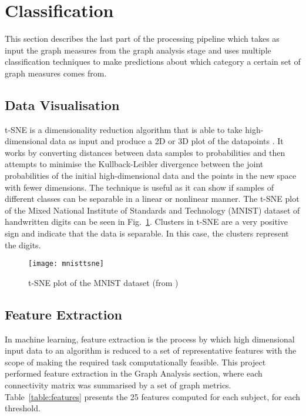 
	\section{Classification}
	This section describes the last part of the processing pipeline which takes as input the graph measures from the graph analysis stage and uses multiple classification techniques to make predictions about which category a certain set of graph measures comes from.

	\subsection{Data Visualisation}
	\ac{t-SNE} is a dimensionality reduction algorithm that is able to take high-dimensional data as input and produce a 2D or 3D plot of the datapoints \autocite{Maaten2008}. It works by converting distances between data samples to probabilities and then attempts to minimise the Kullback-Leibler divergence between the joint probabilities of the initial high-dimensional data and the points in the new space with fewer dimensions. The technique is useful as it can show if samples of different classes can be separable in a linear or nonlinear manner. The \ac{t-SNE} plot of the Mixed National Institute of Standards and Technology (MNIST) dataset of handwritten digits can be seen in Fig.~\ref{fig:mnisttsne}. Clusters in \ac{t-SNE} are a very positive sign and indicate that the data is separable. In this case, the clusters represent the digits. 

		\begin{figure}
	    \centering
	    \texttt{[image: mnisttsne]}
	    \caption{t-SNE plot of the MNIST dataset (from \textcite{Fabisch2014})}
	    \label{fig:mnisttsne}
		\end{figure}

		\subsection{Feature Extraction}
		In machine learning, feature extraction is the process by which high dimensional input data to an algorithm is reduced to a set of representative features with the scope of making the required task computationally feasible. This project performed feature extraction in the Graph Analysis section, where each connectivity matrix was summarised by a set of graph metrics. Table~\ref{table:features} presents the 25 features computed for each subject, for each threshold.

